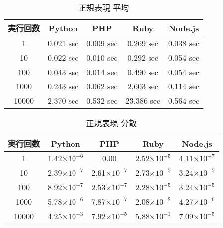 \begin{table}[tb]
\centering
\begin{tabular}{|c||c|c|c|c|}
\hline
実行回数	&Python	&PHP	&Ruby	&Node.js\\ \hline \hline
1	    &0.021 sec	&0.009 sec	&0.269 sec	&0.038 sec\\ \hline
10	    &0.022 sec	&0.010 sec	&0.292 sec	&0.054 sec\\ \hline
100	    &0.043 sec	&0.014 sec	&0.490 sec	&0.054 sec\\ \hline
1000	&0.243 sec	&0.062 sec	&2.603 sec	&0.114 sec\\ \hline
10000	&2.370 sec	&0.532 sec	&23.386 sec	&0.564 sec\\ \hline

\end{tabular}
\caption{正規表現 平均}
\label{table:s-average}
\end{table}

\begin{table}[tb]
\centering
\begin{tabular}{|c||c|c|c|c|}
\hline
実行回数	&Python	&PHP	&Ruby	&Node.js\\ \hline \hline
1	    &1.42$\times 10^{-6}$	&0.00               	&2.52$\times 10^{-5}$	&4.11$\times 10^{-7}$\\ \hline
10	    &2.39$\times 10^{-7}$	&2.61$\times 10^{-7}$	&2.73$\times 10^{-5}$	&3.24$\times 10^{-5}$\\ \hline
100	    &8.92$\times 10^{-7}$	&2.53$\times 10^{-7}$	&2.28$\times 10^{-5}$	&3.24$\times 10^{-5}$\\ \hline
1000	&5.78$\times 10^{-6}$	&7.87$\times 10^{-7}$	&2.08$\times 10^{-2}$	&4.27$\times 10^{-6}$\\ \hline
10000	&4.25$\times 10^{-3}$	&7.92$\times 10^{-5}$	&5.88$\times 10^{-1}$	&7.09$\times 10^{-5}$\\ \hline
\end{tabular}
\caption{正規表現 分散}
\label{table:s-dispersion}
\end{table}